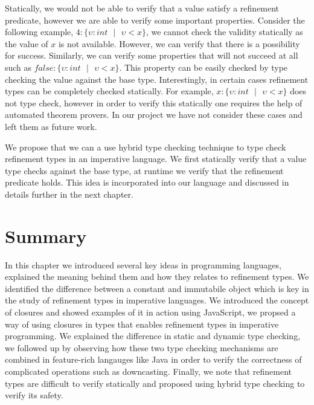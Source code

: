 \documentclass[a4paper,12pt]{report}
\begin{document}
\par
Statically, we would not be able to verify that a value satisfy a refinement 
predicate, however we are able to verify some important properties. Consider the 
following example, $4 : \{\upsilon : int\text{ }|\text{ }\upsilon < x\}$, we 
cannot check the validity statically as the value of $x$ is not available. 
However, we can verify that there is a possibility for success. Similarly, we 
can verify some properties that will not succeed at all such as 
$\textit{false} : \{\upsilon : int\text{ }|\text{ }\upsilon < x\}$. This 
property can be easily checked by type checking the value against the base type. 
Interestingly, in certain cases refinement types can be completely checked 
statically. For example, $x : \{\upsilon : int\text{ }|\text{ }\upsilon < x\}$ 
does not type check, however in order to verify this statically one 
requires the help of automated theorem provers. In our project we have not 
consider these cases and left them as future work. 

\par
We propose that we can a use hybrid type checking technique to type check 
refinement types in an imperative language. We first statically verify that 
a value type checks against the base type, at runtime we verify that the 
refinement predicate holds. This idea is incorporated into our language 
and discussed in details further in the next chapter. 

\section{Summary}
In this chapter we introduced several key ideas in programming languages, 
explained the meaning behind them and how they relates to refinement types. 
We identified the difference between a constant and 
immutabile object which is key in the study of refinement types in 
imperative languages. We introduced the concept of closures and showed examples 
of it in action using JavaScript, we propsed a way of using closures 
in types that enables refinement types in imperative programming. 
We explained the difference in static 
and dynamic type checking, we followed up by observing how these two type 
checking mechanisms are combined in feature-rich langauges like Java in order to 
verify the correctness of complicated operations such as downcasting. Finally, 
we note that refinement types are difficult to verify statically and proposed 
using hybrid type checking to verify its safety. 
\end{document}

